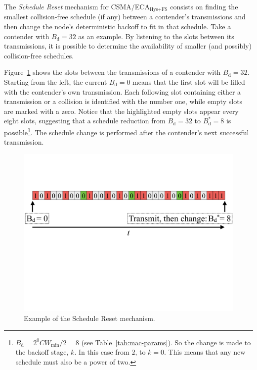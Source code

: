 	The \emph{Schedule Reset} mechanism for CSMA/ECA$_{\text{Hys+FS}}$ consists on finding the smallest collision-free schedule (if any) between a contender's transmissions and then change the node's deterministic backoff to fit in that schedule. Take a contender with $B_{\text{d}}=32$ as an example. By listening to the slots between its transmissions, it is possible to determine the availability of smaller (and possibly) collision-free schedules.
	
	Figure~\ref{fig:scheduleReset1} shows the slots between the transmissions of a contender with $B_{\text{d}}=32$. Starting from the left, the current $B_{\text{d}}=0$ means that the first slot will be filled with the contender's own transmission. Each following slot containing either a transmission or a collision is identified with the number one, while empty slots are marked with a zero. Notice that the highlighted empty slots appear every eight slots, suggesting that a schedule reduction from $B_{\text{d}}=32$ to $B_{\text{d}}^{*}=8$ is possible\footnote{$B_{\text{d}}=2^{0}CW_{\min}/2=8$ (see Table~\ref{tab:mac-params}). So the change is made to the backoff stage, $k$. In this case from $2$, to $k=0$. This means that any new schedule must also be a power of two.}. The schedule change is performed after the contender's next successful transmission.
	
		\begin{figure}[tb]
		\centering
			\includegraphics[width=\linewidth]{figures/tonFigs/scheduleReset.pdf}
			\caption{Example of the Schedule Reset mechanism.}
			\label{fig:scheduleReset1}
		\end{figure}
		
